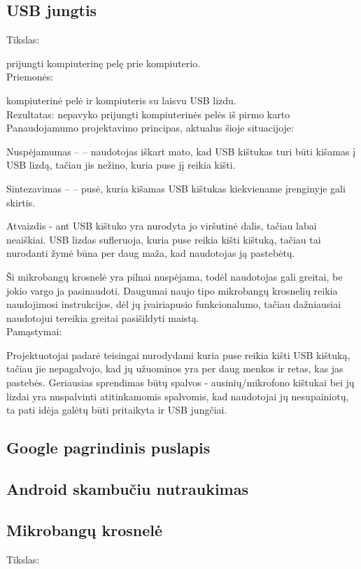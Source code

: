 ﻿\documentclass[a4paper, 12pt]{article}
\newcommand{\placeholder}{\textbf{\textsf{\textcolor{red}{\fbox{PLACEHOLDER}}}}}
\begin{document}
		
	\subsection{USB jungtis}
		Tikslas:
		
		prijungti kompiuterinę pelę prie kompiuterio.\\ 	
		Priemonės: 
		
		kompiuterinė pelė ir kompiuteris su laisvu USB lizdu.\\ 		
		Rezultatas:
		nepavyko prijungti kompiuterinės pelės iš pirmo karto\\ 	
		Panaudojamumo projektavimo principas, aktualus šioje situacijoje:
		
		Nuspėjamumas – – naudotojas iškart mato, kad USB kištukas turi būti kišamas į USB lizdą, tačiau jis nežino, kuria puse jį reikia kišti.
			
		Sintezavimas – – pusė, kuria kišamas USB kištukas kiekviename įrenginyje gali skirtis.
			
		Atvaizdis - ant USB kištuko yra nurodyta jo viršutinė dalis, tačiau labai neaiškiai. USB lizdas sufleruoja, kuria puse reikia kišti kištuką, tačiau tai nurodanti žymė būna per daug maža, kad naudotojas ją pastebėtų.
			
		Ši mikrobangų krosnelė yra pilnai nuspėjama, todėl naudotojas gali greitai, be jokio vargo ja pasinaudoti. Daugumai naujo tipo mikrobangų krosnelių reikia naudojimosi instrukcijos, dėl jų įvairiapusio funkcionalumo, tačiau dažniausiai naudotojui tereikia greitai pasišildyti maistą.\\
		Pamąstymai:
		
		Projektuotojai padarė teisingai nurodydami kuria puse reikia kišti USB kištuką, tačiau jie nepagalvojo, kad jų užuominos yra per daug menkos ir retas, kas jas pastebės. Geriausias sprendimas būtų spalvos - ausinių/mikrofono kištukai bei jų lizdai yra nuspalvinti atitinkamomis spalvomis, kad naudotojai jų nesupainiotų, ta pati idėja galėtų būti pritaikyta ir USB jungčiai.	
	\subsection{Google pagrindinis puslapis}
		\placeholder
	\subsection{Android skambučiu nutraukimas}
		\placeholder
	\subsection{Mikrobangų krosnelė}
		Tikslas:
		
\end{document}
